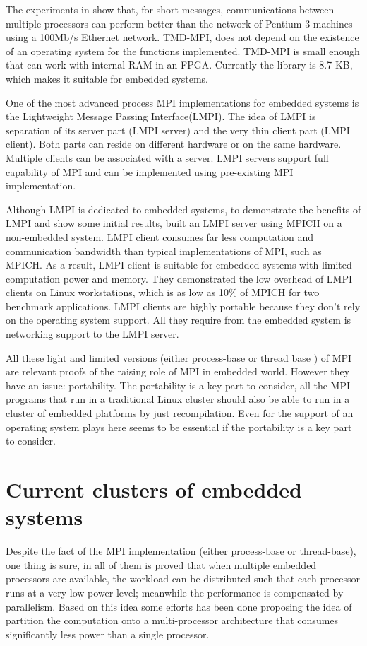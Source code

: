 The experiments in \cite{Saldana-Chow}  show that, for short messages,
communications between multiple processors can perform better than the network
of Pentium 3 machines using a 100Mb/s Ethernet network. TMD-MPI, does not
depend on the existence of an operating system for the functions implemented.
TMD-MPI is small enough that can work with internal RAM in an FPGA. Currently
the library is 8.7 KB, which makes it suitable for embedded systems.

One of the most advanced process MPI implementations for embedded
systems is the Lightweight Message Passing Interface(LMPI)\cite{Abgaria}. The
idea of LMPI is separation of its server part (LMPI server) and the very thin
client part (LMPI client). Both parts can reside on different hardware or on
the same hardware. Multiple clients can be associated with a server. LMPI
servers support full capability of MPI and can be implemented using
pre-existing MPI implementation. 

Although LMPI is dedicated to embedded systems, to demonstrate the benefits of
LMPI and show some initial results, \cite{Abgaria} built an LMPI server using
MPICH on a non-embedded system. LMPI client consumes far less computation and
communication bandwidth than typical implementations of MPI, such as MPICH.  As
a result, LMPI client is suitable for embedded systems with limited computation
power and memory. They demonstrated the low overhead of LMPI clients on Linux
workstations, which is as low as 10\% of MPICH for two benchmark applications.
LMPI clients are highly portable because they don't rely on the operating
system support. All they require from the embedded system is networking support
to the LMPI server.

All these light and limited versions (either process-base or thread base ) of
MPI are relevant proofs of the raising role of MPI in embedded world. However
they have an issue: portability. The portability is a key part to consider, all
the MPI programs that run in a traditional Linux cluster should also be able to
run in a cluster of embedded platforms  by just recompilation.  Even for
\cite{Gallego} the support of an operating system plays here seems to be
essential if the portability is a key part to consider.

\section{Current clusters of embedded systems}

Despite the fact of the MPI implementation (either process-base or
thread-base), one thing is sure, in all of them is proved that when multiple
embedded processors are available, the workload can be distributed such that
each processor runs at a very low-power level; meanwhile the performance is
compensated by parallelism. Based on this idea some efforts has been done
\cite{Liu} \cite{Weglarz} proposing the idea of partition the computation onto
a multi-processor architecture that consumes significantly less power than a
single processor.

